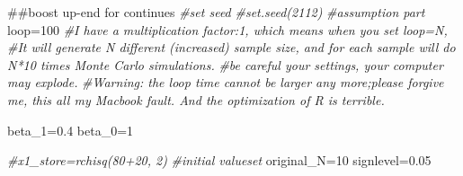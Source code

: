 \documentclass[]{article}
\newenvironment{Shaded}{\begin{snugshade}}{\end{snugshade}}
\newcommand{\DecValTok}[1]{\textcolor[rgb]{0.00,0.00,0.81}{{#1}}}
\newcommand{\FloatTok}[1]{\textcolor[rgb]{0.00,0.00,0.81}{{#1}}}
\newcommand{\CommentTok}[1]{\textcolor[rgb]{0.56,0.35,0.01}{\textit{{#1}}}}
\newcommand{\NormalTok}[1]{{#1}}
\begin{document}
\begin{Shaded}
\begin{Highlighting}[]
\NormalTok{##boost up-end for continues}
\CommentTok{#set seed}
\CommentTok{#set.seed(2112)}
\CommentTok{#assumption part}
\NormalTok{loop=}\DecValTok{100}
\CommentTok{#I have a multiplication factor:1, which means when you set loop=N, }
\CommentTok{#It will generate N different (increased) sample size, and for each sample will do N*10 times Monte Carlo simulations.}
\CommentTok{#be careful your settings, your computer may explode.}
\CommentTok{#Warning: the loop time cannot be larger any more;please forgive me, this all my Macbook fault. And the optimization of R is terrible.}

\NormalTok{beta_1=}\FloatTok{0.4}
\NormalTok{beta_0=}\DecValTok{1}

\CommentTok{#x1_store=rchisq(80+20, 2)}
\CommentTok{#initial valueset}
\NormalTok{original_N=}\DecValTok{10}
\NormalTok{signlevel=}\FloatTok{0.05}


\end{Highlighting}
\end{Shaded}
\end{document}
